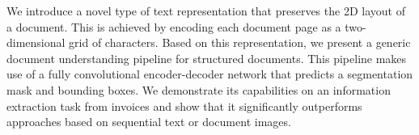 We introduce a novel type of text representation that preserves the 2D layout of a document. This is achieved by encoding each document page as a two-dimensional grid of characters. Based on this representation, we present a generic document understanding pipeline for structured documents. This pipeline makes use of a fully convolutional encoder-decoder network that predicts a segmentation mask and bounding boxes. We demonstrate its capabilities on an information extraction task from invoices and show that it significantly outperforms approaches based on sequential text or document images.
